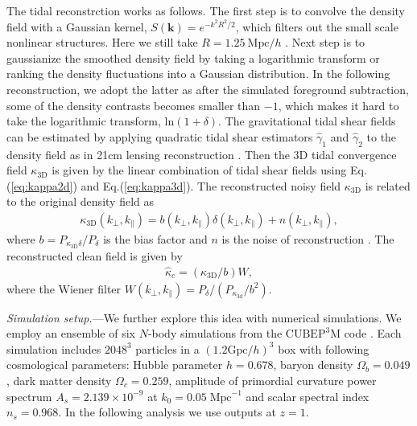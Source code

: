 \documentclass[aps,prl,twocolumn,showpacs,superscriptaddress,groupedaddress,nofootinbib]{revtex4}  %
\newcommand{\mr}{\mathrm}
\begin{document}
The tidal reconstrction works as follows. The first step is to convolve
the density field with a Gaussian kernel, $S(\bm{k})=e^{-k^2R^2/2}$, which
filters out the small scale nonlinear structures.
Here we still take $R=1.25\ \mr{Mpc}/h$ \cite{2012:pen}\cite{2015:zhu}.
Next step is to gaussianize the smoothed density field by taking a logarithmic
transform or ranking the density fluctuations into a Gaussian distribution.
In the following reconstruction, we adopt the latter as after the simulated
foreground subtraction, some of the density contrasts becomes smaller than $-1$,
which makes it hard to take the logarithmic transform, $\mathrm{ln}(1+\delta)$.
The gravitational tidal shear fields can be estimated by applying quadratic 
tidal shear estimators $\hat{\gamma}_1$ and $\hat{\gamma}_2$ to the density 
field as in 21cm lensing reconstruction \cite{2008:lu}. 
Then the 3D tidal convergence field $\kappa_\mr{3D}$ is given by the linear 
combination of tidal shear fields using Eq.(\ref{eq:kappa2d}) and 
Eq.(\ref{eq:kappa3d}).
The reconstructed noisy field $\kappa_\mr{3D}$ is related to the original 
density field as 
\begin{eqnarray}
\kappa_\mr{3D}(k_\perp,k_\parallel)=b(k_\perp,k_\parallel)
\delta(k_\perp,k_\parallel)+n(k_\perp,k_\parallel),
\end{eqnarray}
where $b=P_{\kappa_\mr{3D}\delta}/P_{\delta}$ is the bias factor and $n$ is 
the noise of reconstruction \cite{2015:zhu}. 
The reconstructed clean field is given by 
\begin{eqnarray}
\label{eq:kapc}
\hat{\kappa}_c=({\kappa_\mr{3D}}/{b})W,
\end{eqnarray}
where the Wiener filter $W(k_\perp,k_\parallel)=
P_\delta/(P_{\kappa_\mr{3d}}/b^2)$.


{\it Simulation setup.}---We further explore this idea with numerical 
simulations. We employ an ensemble of six $N$-body simulations from the
$\mr{CUBEP}^3\mr{M}$ code \cite{2013:code}. 
Each simulation includes $2048^3$ particles in a $(1.2\mr{Gpc}/h)^3$ box 
with following cosmological parameters: Hubble parameter $h=0.678$, baryon
density $\Omega_{b}=0.049$, dark matter density $\Omega_{c}=0.259$,
amplitude of primordial curvature power spectrum $A_s=2.139\times10^{-9}$ at 
$k_0=0.05\;\mr{Mpc}^{-1}$ and scalar spectral index $n_s=0.968$.
In the following analysis we use outputs at $z=1$.
\end{document}
